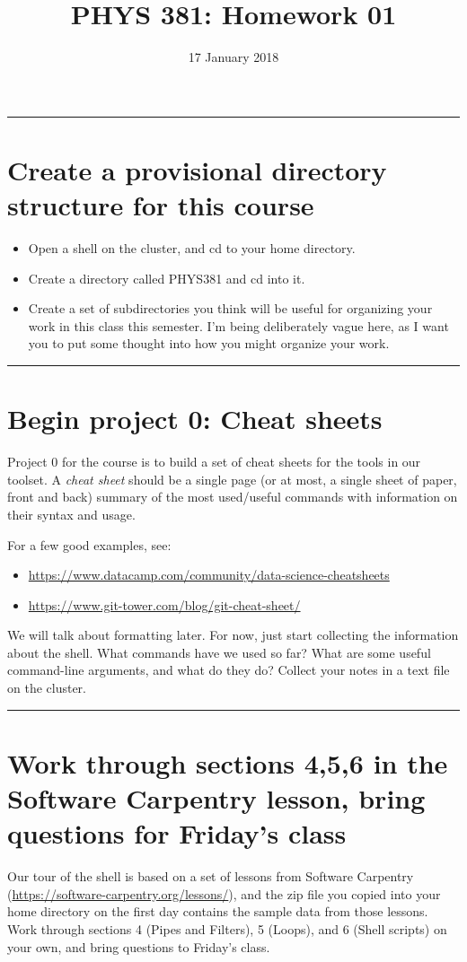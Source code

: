 \documentclass{tufte-handout}
\date{17 January 2018}
\title{PHYS 381: Homework 01}
\begin{document}
\maketitle
\rule{\linewidth}{0.5pt}
\section{Create a provisional directory structure for this course}
\label{sec-1}
\begin{itemize}
\item Open a shell on the cluster, and cd to your home directory.
\item Create a directory called PHYS381 and cd into it.
\item Create a set of subdirectories you think will be useful for
organizing your work in this class this semester. I'm being
deliberately vague here, as I want you to put some thought into how
you might organize your work.
\end{itemize}

\rule{\linewidth}{0.5pt}
\section{Begin project 0: Cheat sheets}
\label{sec-2}
Project 0 for the course is to build a set of cheat sheets for the tools in our toolset. A \emph{cheat sheet} should be a single page (or at most, a single sheet of paper, front and back) summary of the most used/useful commands with information on their syntax and usage.

For a few good examples, see:
\begin{itemize}
\item \url{https://www.datacamp.com/community/data-science-cheatsheets}
\item \url{https://www.git-tower.com/blog/git-cheat-sheet/}
\end{itemize}

We will talk about formatting later. For now, just start collecting the information about the shell. What commands have we used so far? What are some useful command-line arguments, and what do they do? Collect your notes in a text file on the cluster.

\rule{\linewidth}{0.5pt}
\section{Work through sections 4,5,6 in the Software Carpentry lesson, bring questions for Friday's class}
\label{sec-3}
Our tour of the shell is based on a set of lessons from Software Carpentry (\url{https://software-carpentry.org/lessons/}), and the zip file you copied into your home directory on the first day contains the sample data from those lessons. Work through sections 4 (Pipes and Filters), 5 (Loops), and 6 (Shell scripts) on your own, and bring questions to Friday's class.
\end{document}
